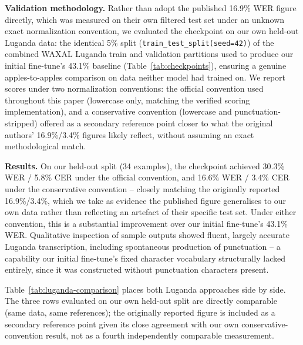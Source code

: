 \documentclass[11pt]{article}
\begin{document}
\textbf{Validation methodology.} Rather than adopt the published 16.9\% WER figure directly, which was measured on their own filtered test set under an unknown exact normalization convention, we evaluated the checkpoint on our own held-out Luganda data: the identical 5\% split (\texttt{train\_test\_split(seed=42)}) of the combined WAXAL Luganda train and validation partitions used to produce our initial fine-tune's 43.1\% baseline (Table~\ref{tab:checkpoints}), ensuring a genuine apples-to-apples comparison on data neither model had trained on. We report scores under two normalization conventions: the official convention used throughout this paper (lowercase only, matching the verified scoring implementation), and a conservative convention (lowercase and punctuation-stripped) offered as a secondary reference point closer to what the original authors' 16.9\%/3.4\% figures likely reflect, without assuming an exact methodological match.

\textbf{Results.} On our held-out split (34 examples), the checkpoint achieved 30.3\% WER / 5.8\% CER under the official convention, and 16.6\% WER / 3.4\% CER under the conservative convention -- closely matching the originally reported 16.9\%/3.4\%, which we take as evidence the published figure generalises to our own data rather than reflecting an artefact of their specific test set. Under either convention, this is a substantial improvement over our initial fine-tune's 43.1\% WER. Qualitative inspection of sample outputs showed fluent, largely accurate Luganda transcription, including spontaneous production of punctuation -- a capability our initial fine-tune's fixed character vocabulary structurally lacked entirely, since it was constructed without punctuation characters present.

Table~\ref{tab:luganda-comparison} places both Luganda approaches side by side. The three rows evaluated on our own held-out split are directly comparable (same data, same references); the originally reported figure is included as a secondary reference point given its close agreement with our own conservative-convention result, not as a fourth independently comparable measurement.
\end{document}
